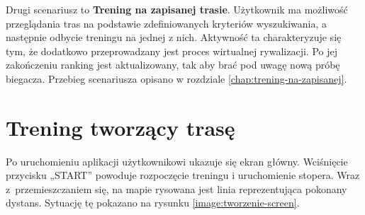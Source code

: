Drugi scenariusz to \textbf{Trening na zapisanej trasie}. Użytkownik ma możliwość przeglądania tras na podstawie zdefiniowanych kryteriów wyszukiwania, a następnie odbycie treningu na jednej z nich. Aktywność ta charakteryzuje się tym, że dodatkowo przeprowadzany jest proces wirtualnej rywalizacji. Po jej zakończeniu ranking jest aktualizowany, tak aby brać pod uwagę nową próbę biegacza. Przebieg scenariusza opisano w rozdziale \ref{chap:trening-na-zapisanej}.

\section{Trening tworzący trasę}\label{chap:trening-tworzacy}
Po uruchomieniu aplikacji użytkownikowi ukazuje się ekran główny. Wciśnięcie przycisku „START” powoduje rozpoczęcie treningu i uruchomienie stopera. Wraz z~przemieszczaniem się, na mapie rysowana jest linia reprezentująca pokonany dystans. Sytuację tę pokazano na rysunku \ref{image:tworzenie-screen}.

